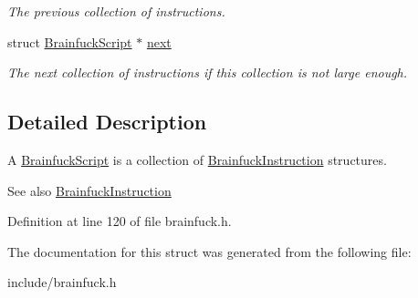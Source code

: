 \begin{DoxyCompactItemize}
\begin{DoxyCompactList}\small\item\em The previous collection of instructions. \end{DoxyCompactList}\item 
\hypertarget{structBrainfuckScript_a74000c29ef094e786a286b733c4ad0bd}{}struct \hyperlink{structBrainfuckScript}{Brainfuck\+Script} $\ast$ \hyperlink{structBrainfuckScript_a74000c29ef094e786a286b733c4ad0bd}{next}\label{structBrainfuckScript_a74000c29ef094e786a286b733c4ad0bd}

\begin{DoxyCompactList}\small\item\em The next collection of instructions if this collection is not large enough. \end{DoxyCompactList}\end{DoxyCompactItemize}


\subsection{Detailed Description}
A \hyperlink{structBrainfuckScript}{Brainfuck\+Script} is a collection of \hyperlink{structBrainfuckInstruction}{Brainfuck\+Instruction} structures. 

\begin{DoxySeeAlso}{See also}
\hyperlink{structBrainfuckInstruction}{Brainfuck\+Instruction} 
\end{DoxySeeAlso}


Definition at line 120 of file brainfuck.\+h.



The documentation for this struct was generated from the following file\+:\begin{DoxyCompactItemize}
\item 
include/brainfuck.\+h\end{DoxyCompactItemize}

